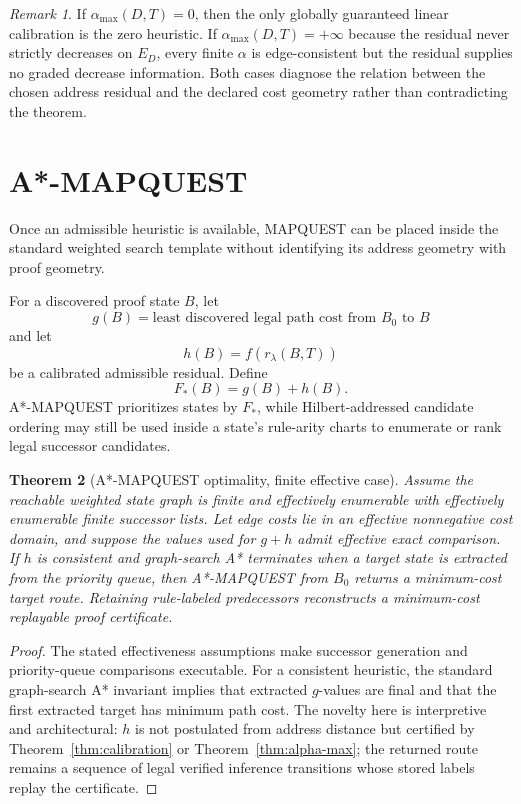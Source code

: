 \documentclass[11pt]{article}
\newtheorem{theorem}{Theorem}[section]
\theoremstyle{definition}
\theoremstyle{remark}
\newtheorem{remark}[theorem]{Remark}
\begin{document}
\begin{remark}
If $\alpha_{\max}(D,T)=0$, then the only globally guaranteed linear calibration is the zero heuristic. If $\alpha_{\max}(D,T)=+\infty$ because the residual never strictly decreases on $E_D$, every finite $\alpha$ is edge-consistent but the residual supplies no graded decrease information. Both cases diagnose the relation between the chosen address residual and the declared cost geometry rather than contradicting the theorem.
\end{remark}

\section{A*-MAPQUEST}

Once an admissible heuristic is available, MAPQUEST can be placed inside the standard weighted search template without identifying its address geometry with proof geometry.

For a discovered proof state $B$, let
\[
g(B)=\text{least discovered legal path cost from }B_0\text{ to }B
\]
and let
\[
h(B)=f(r_\lambda(B,T))
\]
be a calibrated admissible residual. Define
\[
F_{\!*}(B)=g(B)+h(B).
\]
A*-MAPQUEST prioritizes states by $F_{\!*}$, while Hilbert-addressed candidate ordering may still be used inside a state's rule-arity charts to enumerate or rank legal successor candidates.

\begin{theorem}[A*-MAPQUEST optimality, finite effective case]\label{thm:astar}
Assume the reachable weighted state graph is finite and effectively enumerable with effectively enumerable finite successor lists. Let edge costs lie in an effective nonnegative cost domain, and suppose the values used for $g+h$ admit effective exact comparison. If $h$ is consistent and graph-search A* terminates when a target state is extracted from the priority queue, then A*-MAPQUEST from $B_0$ returns a minimum-cost target route. Retaining rule-labeled predecessors reconstructs a minimum-cost replayable proof certificate.
\end{theorem}

\begin{proof}
The stated effectiveness assumptions make successor generation and priority-queue comparisons executable. For a consistent heuristic, the standard graph-search A* invariant implies that extracted $g$-values are final and that the first extracted target has minimum path cost. The novelty here is interpretive and architectural: $h$ is not postulated from address distance but certified by Theorem~\ref{thm:calibration} or Theorem~\ref{thm:alpha-max}; the returned route remains a sequence of legal verified inference transitions whose stored labels replay the certificate.
\end{proof}
\end{document}
